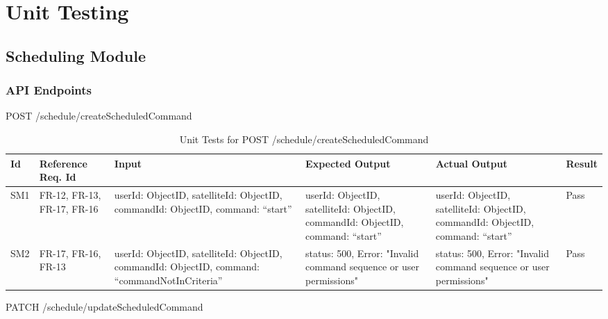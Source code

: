\documentclass[12pt, titlepage]{article}
\begin{document}
\section{Unit Testing}

\subsection{Scheduling Module}
\subsubsection{API Endpoints}


POST /schedule/createScheduledCommand


\begin{center}
\begin{longtable}{|p{1cm} | p{2cm} |p{2cm}| p{2cm} |p{2cm}| p{2cm}|}
\caption{Unit Tests for  \newline 
POST /schedule/createScheduledCommand}
\hline
\textbf{Id} & \textbf{Reference Req. Id} & \textbf{Input} & \textbf{Expected Output} & \textbf{Actual Output} & \textbf{Result} \\
\hline
SM1 & FR-12, FR-13, FR-17, FR-16  & { userId: ObjectID,
satelliteId: ObjectID,
commandId: ObjectID,
command: “start” } & { userId: ObjectID,
satelliteId: ObjectID,
commandId: ObjectID,
command: “start” } & { userId: ObjectID,
satelliteId: ObjectID,
commandId: ObjectID,
command: “start” } & Pass
\\
\hline
SM2 & FR-17, FR-16, FR-13 & { userId: ObjectID,
satelliteId: ObjectID,
commandId: ObjectID,
command: “commandNotInCriteria” }
 & { status: 500,
Error: "Invalid command sequence or user permissions" }
 & { status: 500,
Error: "Invalid command sequence or user permissions" }
 & Pass
\\
\hline

\end{longtable}

\end{center}

PATCH /schedule/updateScheduledCommand
\end{document}
